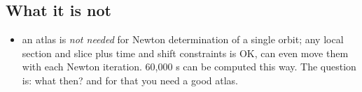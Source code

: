 \subsection{What it is not}
    \begin{itemize}
      \item an atlas is \emph{not needed} for Newton determination of a
            single orbit; any local section and slice plus time and shift
            constraints is OK, can even move them with each Newton
            iteration. 60,000 \rpo s can be computed this way.
            The question is: what then? and for that you need a good atlas.
    \end{itemize}
